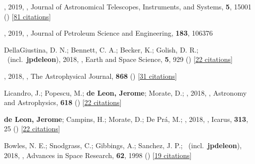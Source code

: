 \item[{\color{numcolor}\scriptsize93}] , 2019, , Journal of Astronomical Telescopes, Instruments, and Systems, \textbf{5}, 15001 () [\href{https://ui.adsabs.harvard.edu/abs/2019JATIS...5a5001N}{81 citations}]

\item[{\color{numcolor}\scriptsize92}] , 2019, , Journal of Petroleum Science and Engineering, \textbf{183}, 106376

\item[{\color{numcolor}\scriptsize91}] DellaGiustina, D. N.; Bennett, C. A.; Becker, K.; Golish, D. R.; \etal\ (incl.\ \textbf{jpdeleon}), 2018, , Earth and Space Science, \textbf{5}, 929 () [\href{https://ui.adsabs.harvard.edu/abs/2018E&SS....5..929D}{22 citations}]

\item[{\color{numcolor}\scriptsize90}] , 2018, , The Astrophysical Journal, \textbf{868} () [\href{https://ui.adsabs.harvard.edu/abs/2018ApJ...868L...3M}{31 citations}]

\item[{\color{numcolor}\scriptsize89}] Licandro, J.; Popescu, M.; \textbf{de Leon, Jerome}; Morate, D.; \etal, 2018, , Astronomy and Astrophysics, \textbf{618} () [\href{https://ui.adsabs.harvard.edu/abs/2018A&A...618A.170L}{22 citations}]

\item[{\color{numcolor}\scriptsize88}] \textbf{de Leon, Jerome}; Campins, H.; Morate, D.; De Pr{\'a}, M.; \etal, 2018, , Icarus, \textbf{313}, 25 () [\href{https://ui.adsabs.harvard.edu/abs/2018Icar..313...25D}{22 citations}]

\item[{\color{numcolor}\scriptsize87}] Bowles, N. E.; Snodgrass, C.; Gibbings, A.; Sanchez, J. P.; \etal\ (incl.\ \textbf{jpdeleon}), 2018, , Advances in Space Research, \textbf{62}, 1998 () [\href{https://ui.adsabs.harvard.edu/abs/2018AdSpR..62.1998B}{19 citations}]

